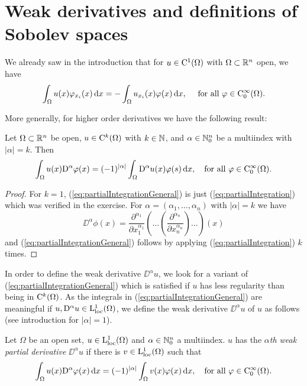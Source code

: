 \chapter{Weak derivatives and definitions of Sobolev spaces}

We already saw in the introduction that for $u \in \mathrm{C}^1(\Omega)$ with $\Omega \subset \mathbb{R}^n$ open, we have 
\begin{equation}
  \label{eq:partialIntegration}
  \int_\Omega u(x) \varphi_{x_i}(x) \, {\operatorname{d}\!{x}} = -\int_\Omega u_{x_i}(x) \varphi(x) \, {\operatorname{d}\!{x}}, \quad \text{ for all } \varphi \in \mathrm{C}_0^\infty(\Omega).
\end{equation}

More generally, for higher order derivatives we have the following result:
\begin{lem}
  \label{lem:partialIntegrationGeneral}
  Let $\Omega \subset \mathbb{R}^n$ be open, $u \in \mathrm{C}^k(\Omega)$ with $k \in \mathbb{N}$, and $\alpha \in \mathbb{N}_0^n$ be a multiindex with $|\alpha| = k$. Then
  \begin{equation}
    \label{eq:partialIntegrationGeneral}
    \int_\Omega u(x) \mathrm{D}^\alpha \varphi(x) = (-1)^{|\alpha|} \int_\Omega \mathrm{D}^\alpha u(x) \varphi(s) \, {\operatorname{d}\!{x}}, \quad\text{for all } \varphi \in \mathrm{C}_0^\infty(\Omega).
  \end{equation}
\end{lem}

\begin{proof}
  For $k = 1$, (\ref{eq:partialIntegrationGeneral}) is just (\ref{eq:partialIntegration}) which was verified in the exercise.
  For $\alpha = (\alpha_1,\dots,\alpha_n)$ with $|\alpha| = k$ we have
  $$
  \DD^\alpha \phi(x)= \frac{\partial^{\alpha_1}}{\partial x_1^{\alpha_1}} ( \dots ( \frac{\partial^{\alpha_n}}{\partial x_n^{\alpha_n}} ) \dots )(x)
  $$
  and (\ref{eq:partialIntegrationGeneral}) follows by applying (\ref{eq:partialIntegration}) $k$ times.
\end{proof}

In order to define the weak derivative $\DD^\alpha u$, we look for a variant of (\ref{eq:partialIntegrationGeneral}) which is satisfied if $u$ has less regularity than being in $\mathrm{C}^k(\Omega)$.
As the integrals in (\ref{eq:partialIntegrationGeneral}) are meaningful if $u, \mathrm{D}^\alpha u \in \mathrm{L}^1_{\operatorname{loc}}(\Omega)$, we define the weak derivative $\DD^\alpha u$ of $u$ as follows (see introduction for $|\alpha| = 1$).

\begin{defn}
  \label{defn:weakPartialDerivative}
  Let $\Omega$ be an open set, $u \in \mathrm{L}^1_{\operatorname{loc}}(\Omega)$ and $\alpha \in \mathbb{N}_0^n$ a multiindex. 
  $u$ has the \emph{$\alpha$th weak partial derivative}  $\DD^\alpha u$ if there is $v \in \mathrm{L}_{\operatorname{loc}}^1(\Omega)$ such that
  \begin{equation}
    \label{eq:weakPartialDerivativeDef}
    \int_\Omega u(x) \mathrm{D}^\alpha \varphi(x) \, {\operatorname{d}\!{x}} = (-1)^{|\alpha|} \int_\Omega v(x) \varphi(x) \, {\operatorname{d}\!{x}}, \quad \text{for all } \varphi \in \mathrm{C}_0^\infty(\Omega).
  \end{equation}
\end{defn}

